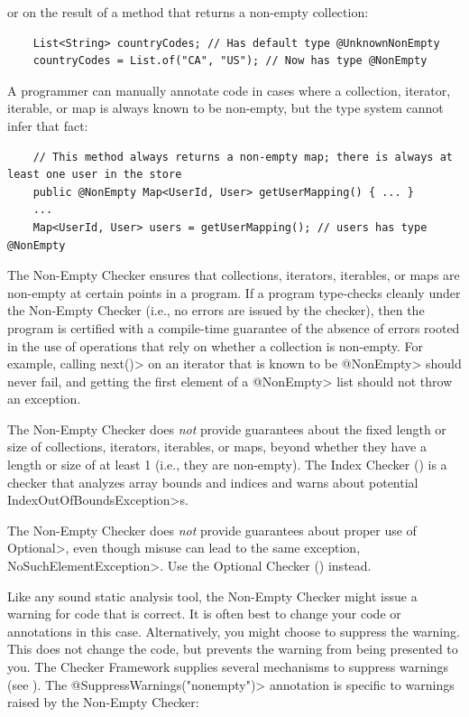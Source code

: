 \noindent
or on the result of a method that returns a non-empty collection:

\begin{Verbatim}
    List<String> countryCodes; // Has default type @UnknownNonEmpty
    countryCodes = List.of("CA", "US"); // Now has type @NonEmpty
\end{Verbatim}

A programmer can manually annotate code in cases where a collection,
iterator, iterable, or map is always known to be non-empty, but the type
system cannot infer that fact:

\begin{Verbatim}
    // This method always returns a non-empty map; there is always at least one user in the store
    public @NonEmpty Map<UserId, User> getUserMapping() { ... }
    ...
    Map<UserId, User> users = getUserMapping(); // users has type @NonEmpty
\end{Verbatim}


The Non-Empty Checker ensures that collections, iterators, iterables, or maps
are non-empty at certain points in a program.
If a program type-checks cleanly under the Non-Empty Checker (i.e., no errors
are issued by the checker), then the program is certified with a compile-time
guarantee of the absence of errors rooted in the use of operations that
rely on whether a collection is non-empty.
For example, calling \<next()> on an iterator that is known to be \<@NonEmpty>
should never fail, and getting the first element of a \<@NonEmpty> list should
not throw an exception.

The Non-Empty Checker does \emph{not} provide guarantees about the fixed
length or size of collections, iterators, iterables, or maps, beyond whether
they have a length or size of at least 1 (i.e., they are non-empty).
The Index Checker () is a checker that analyzes
array bounds and indices and warns about potential
\<IndexOutOfBoundsException>s.

The Non-Empty Checker does \emph{not} provide guarantees about proper use
of \<Optional>, even though misuse can lead to the same exception,
\<NoSuchElementException>.  Use the Optional Checker
() instead.



Like any sound static analysis tool, the Non-Empty Checker might issue a warning
for code that is correct.
It is often best to change your code or annotations in this case.
Alternatively, you might choose to suppress the warning.
This does not change the code, but prevents the warning from being presented to
you.
The Checker Framework supplies several mechanisms to suppress warnings (see
).
The \<@SuppressWarnings("nonempty")> annotation is specific to warnings raised
by the Non-Empty Checker:

